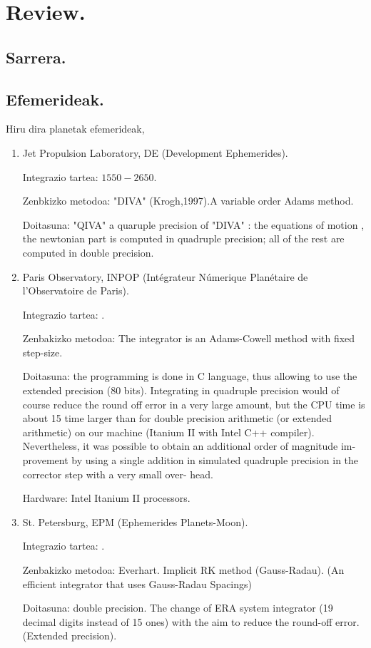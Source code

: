 \chapter{Review.}

\section{Sarrera.}

\section{Efemerideak.}

Hiru dira planetak efemerideak,

\begin{enumerate}
\item Jet Propulsion Laboratory, DE (Development Ephemerides).

      Integrazio tartea: $1550-2650$.

      Zenbkizko metodoa: "DIVA" (Krogh,1997).A variable order Adams method.
      
      Doitasuna: "QIVA" a quaruple precision of "DIVA" : the equations of motion , the newtonian part is computed in quadruple precision; all of the rest are computed in double precision.

\item Paris Observatory, INPOP (Intégrateur Númerique Planétaire de l'Observatoire de Paris).
      
      Integrazio tartea: .
      
	  Zenbakizko metodoa: The integrator is an Adams-Cowell method with fixed step-size.
	  
	  Doitasuna:  the programming is done in C language, thus allowing to use the extended precision (80 bits). 
	  Integrating in quadruple precision would of course reduce the round off error in a very large amount, but the
	  CPU time is about 15 time larger than for double precision arithmetic (or extended arithmetic) on our machine
	  (Itanium II with Intel C++ compiler). Nevertheless, it was possible to obtain an additional order of magnitude im-
	  provement by using a single addition in simulated quadruple precision in the corrector step with a very small over-
	  head.
	  
	  Hardware: Intel Itanium II processors.
	  
\item St. Petersburg, EPM (Ephemerides Planets-Moon).
      
      Integrazio tartea: .
      
      Zenbakizko metodoa: Everhart. Implicit RK method (Gauss-Radau).
      (An efficient integrator that uses Gauss-Radau Spacings)
      
      Doitasuna: double precision. The change of ERA system integrator (19 decimal digits instead of 15 ones) with the aim to reduce the round-off error. (Extended precision).
      
\end{enumerate}

